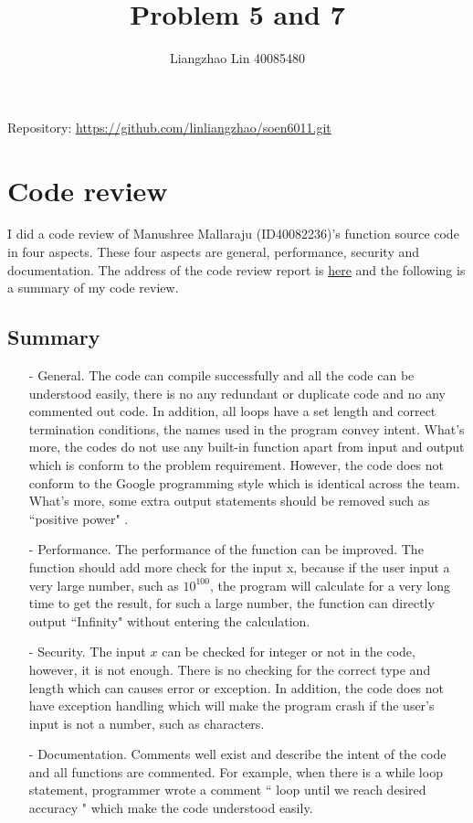 \documentclass[12pt]{extarticle}
\title{Problem 5 and 7}
\date{}
\author{Liangzhao Lin 40085480}
\newcommand{\<}{\langle}
\renewcommand{\>}{\rangle}
\theoremstyle{definition}
\begin{document}
\maketitle
\centerline {Repository: \url{https://github.com/linliangzhao/soen6011.git}}

\section{Code review}
\indent
I did a code review of Manushree Mallaraju (ID40082236)'s function source code in four aspects. These four aspects are general, performance, security and documentation. The address of the code review report is
\href{https://github.com/linliangzhao/soen6011/commit/37d2a90a38c852aa9674cc876f847244e332c16c#commitcomment-34526371}{here}
and the following is a summary of my code review.
\subsection{Summary}
\begin{enumerate}
\item[-]General. The code can compile successfully and all the code can be understood easily, there is no any redundant or duplicate code and no any commented out code. In addition, all loops  have a set length and correct termination conditions, the names used in the program convey intent. What's more, the codes do not use any built-in function apart from input and output which is conform to the problem requirement. However, the code does not conform to the Google programming style which is identical across the team. What's more, some extra output statements should be removed such as “positive power" .
\item[-]Performance. The performance of the function can be improved. The function should add more check for the input x, because if the user input a very large number, such as $10^{100}$, the program will calculate for a very long time to get the result, for such a large number, the function can directly output “Infinity" without entering the calculation.
\item[-]Security. The input $x$ can be checked for integer or not in the code, however, it is not enough. There is no checking for the correct type and length which can causes error or exception.
In addition, the code does not have exception handling which will make the program crash if the user's input is not a number, such as characters.
\item[-]Documentation. Comments well exist and describe the intent of the code and all functions are commented. For example, when there is a while loop statement, programmer wrote a comment “ loop until we reach desired accuracy " which make the code understood easily.
\end{enumerate}
\end{document}
